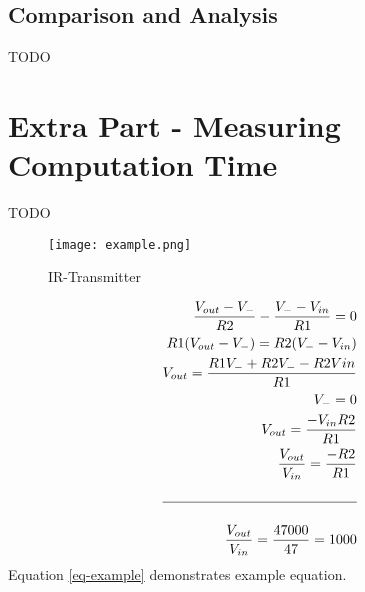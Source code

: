 \documentclass{article}	%
\begin{document}
\subsection{Comparison and Analysis}
TODO

\section{Extra Part - Measuring Computation Time}
TODO

\begin{figure}[!hbt]
\begin{center}
\texttt{[image: example.png]}
\end{center}
\caption{IR-Transmitter}
\label{FIG-TRANSMITTER}
\end{figure}

\begin{equation}
\begin{split}
\frac{V_{out}-V_-}{R2}-\frac{V_--V_{in}}{R1}=0 \\
R1(V_{out}-V_-)=R2(V_--V_{in}) \\
V_{out}=\frac{R1V_-+R2V_--R2V{in}}{R1} \\
V_-=0 \\
V_{out}=\frac{-V_{in}R2}{R1} \\
\frac{V_{out}}{V_{in}}=\frac{-R2}{R1} \\ \\
\hline \\
\frac{V_{out}}{V_{in}}=\frac{47000}{47}=1000 \\
\end{split}
\label{eq-example}
\end{equation}
Equation \ref{eq-example} demonstrates example equation.


\end{document}
